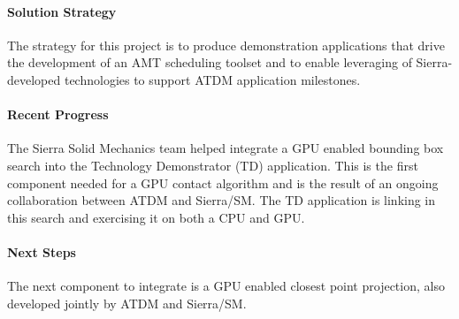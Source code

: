 \paragraph{Solution Strategy}

The strategy for this project is to produce demonstration applications
that drive the development of an AMT scheduling toolset and to enable
leveraging of Sierra-developed technologies to support ATDM
application milestones.

\paragraph{Recent Progress}

The Sierra Solid Mechanics team helped integrate a GPU enabled bounding
box search into the Technology Demonstrator (TD) application. This is the
first component needed for a GPU contact algorithm and is the result
of an ongoing collaboration between ATDM and Sierra/SM. The TD
application is linking in this search and exercising it on both a CPU
and GPU.

\paragraph{Next Steps}

The next component to integrate is a GPU enabled closest point
projection, also developed jointly by ATDM and Sierra/SM.


